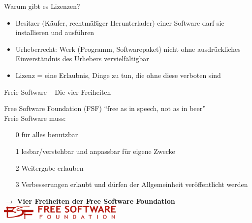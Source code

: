 \documentclass[aspectratio=43]{beamer}
\begin{document}
\begin{frame}{Warum gibt es Lizenzen?}
  \begin{itemize}
    \item Besitzer (Käufer, rechtmäßiger Herunterlader) einer Software darf sie installieren und ausführen 
    \item Urheberrecht: Werk (Programm, Softwarepaket) nicht ohne ausdrückliches Einverständnis des Urhebers vervielfältigbar
    \item Lizenz = eine Erlaubnis, Dinge zu tun, die ohne diese verboten sind
  \end{itemize}
\end{frame}

\begin{frame}{Freie Software -- Die vier Freiheiten}
  \begin{block}{Free Software Foundation (FSF)}
        ``free as in speech, not as in beer''\\
    Freie Software muss:
    \begin{enumerate}
      \item[0] für alles benutzbar
      \item[1] lesbar/verstehbar und anpassbar für eigene Zwecke 
      \item[2] Weitergabe erlauben
      \item[3] Verbesserungen erlaubt und dürfen der Allgemeinheit veröffentlicht werden
    \end{enumerate}
    $\rightarrow$ \textbf{Vier Freiheiten der Free Software Foundation}
        \flushright \includegraphics[width=0.45\textwidth]{pix/fsf-logo}
  \end{block}
\end{frame}
\end{document}
